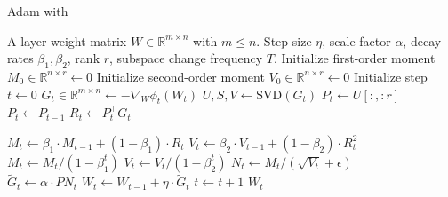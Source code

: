 \newlength\myindent
\setlength\myindent{2em}
\newcommand\bindent{%
  \begingroup
  \setlength{\itemindent}{\myindent}
  \addtolength{\algorithmicindent}{\myindent}
}
\newcommand\eindent{\endgroup}



\begin{algorithm}[tb]
   \caption{Adam with \lowrank}
   \label{alg:low_rank_adam}
 \begin{algorithmic}[1]
    A layer weight matrix $W \in \mathbb{R}^{m \times n}$ with $m \leq n$. Step size $\eta$, scale factor $\alpha$, decay rates $\beta_1, \beta_2$, rank $r$, subspace change frequency $T$.
   \STATE Initialize first-order moment $M_0 \in \mathbb{R}^{n \times r} \gets 0$
   \STATE Initialize second-order moment $V_0 \in \mathbb{R}^{n \times r} \gets 0$
   \STATE Initialize step $t \gets 0$
   \REPEAT
   \STATE $G_t \in \mathbb{R}^{m \times n} \gets - \nabla_W \phi_t(W_t)$ 
   \STATE $U, S, V \gets \text{SVD}(G_t)$
   \STATE $P_t \gets U[:, :r]$ \hfill {}
   \ELSE
   \STATE $P_t \gets P_{t-1}$ \hfill {}
   \ENDIF
   \STATE $R_t \gets P_{t}^{\top} G_t$ \hfill {}
   \\\hrulefill
   \bindent
   \hspace{\algorithmicindent} \STATE $M_t \gets \beta_1 \cdot M_{t-1} + (1 - \beta_1) \cdot R_t$ 
   \hspace{\algorithmicindent} \STATE $V_t \gets \beta_2 \cdot V_{t-1} + (1 - \beta_2) \cdot R_t^2$ 
   \hspace{\algorithmicindent} \STATE $M_t \gets M_t / (1 - \beta_1^t)$
   \hspace{\algorithmicindent} \STATE $V_t \gets V_t / (1 - \beta_2^t)$ 
   \hspace{\algorithmicindent} \STATE $N_t \gets M_t / (\sqrt{V_t} + \epsilon)$
   \eindent
   \\\hrulefill
   \STATE $\tilde G_t \gets \alpha \cdot P N_t$ \hfill {}
   \STATE $W_t \gets W_{t-1} + \eta \cdot \tilde G_t$
   \STATE $t \gets t + 1$
   \RETURN $W_t$
 \end{algorithmic}
\end{algorithm}
